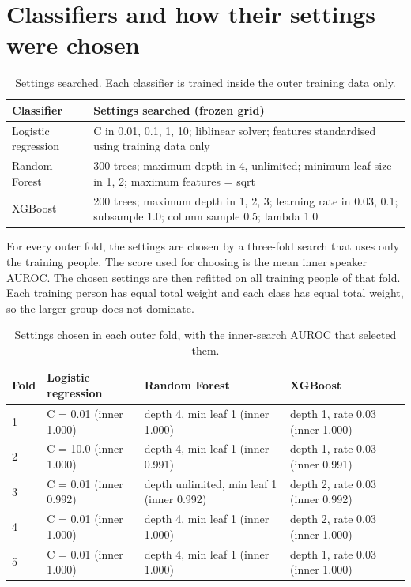 \documentclass[11pt,a4paper]{article}
\begin{document}
\section{Classifiers and how their settings were chosen}\label{sec:classifiers}
\begin{table}[H]\centering\small\renewcommand{\arraystretch}{1.15}
\caption{Settings searched. Each classifier is trained inside the outer training data only.}
\begin{tabular}{lp{11.5cm}}
\toprule
\textbf{Classifier} & \textbf{Settings searched (frozen grid)}\\
\midrule
Logistic regression & C in {0.01, 0.1, 1, 10}; liblinear solver; features standardised using training data only\\
Random Forest & 300 trees; maximum depth in {4, unlimited}; minimum leaf size in {1, 2}; maximum features = sqrt\\
XGBoost & 200 trees; maximum depth in {1, 2, 3}; learning rate in {0.03, 0.1}; subsample 1.0; column sample 0.5; lambda 1.0\\
\bottomrule
\end{tabular}\end{table}
For every outer fold, the settings are chosen by a three-fold search that uses only the training people. The score used for choosing is the mean inner speaker AUROC. The chosen settings are then refitted on all training people of that fold. Each training person has equal total weight and each class has equal total weight, so the larger group does not dominate.

\begin{table}[H]\centering\footnotesize\renewcommand{\arraystretch}{1.15}
\caption{Settings chosen in each outer fold, with the inner-search AUROC that selected them.}
\begin{tabular}{lp{4.6cm}p{4.6cm}p{4.6cm}}
\toprule
\textbf{Fold} & \textbf{Logistic regression} & \textbf{Random Forest} & \textbf{XGBoost}\\
\midrule
1 & C = 0.01 (inner 1.000) & depth 4, min leaf 1 (inner 1.000) & depth 1, rate 0.03 (inner 1.000)\\
2 & C = 10.0 (inner 1.000) & depth 4, min leaf 1 (inner 0.991) & depth 1, rate 0.03 (inner 0.991)\\
3 & C = 0.01 (inner 0.992) & depth unlimited, min leaf 1 (inner 0.992) & depth 2, rate 0.03 (inner 0.992)\\
4 & C = 0.01 (inner 1.000) & depth 4, min leaf 1 (inner 1.000) & depth 2, rate 0.03 (inner 1.000)\\
5 & C = 0.01 (inner 1.000) & depth 4, min leaf 1 (inner 1.000) & depth 1, rate 0.03 (inner 1.000)\\
\bottomrule
\end{tabular}\end{table}
\end{document}
